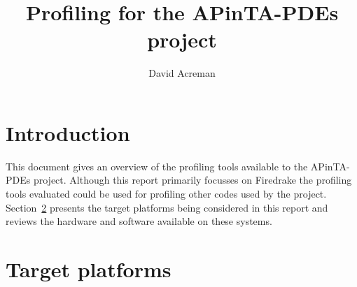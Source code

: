 \documentclass[a4paper,titlepage]{article}
\author{David Acreman}
\title{Profiling for the APinTA-PDEs project}
\begin{document}
\pagestyle{fancy}
\lhead{}
\chead{}

\maketitle
\pagebreak
\tableofcontents
\pagebreak

\section{Introduction}

This document gives an overview of the profiling tools available to the APinTA-PDEs project. Although this report primarily focusses on Firedrake the profiling tools evaluated could be used for profiling other codes used by the project. Section~\ref{section:target_platforms} presents the target platforms being considered in this report and reviews the hardware and software available on these systems. 

\section{Target platforms}
\label{section:target_platforms}
\end{document}
